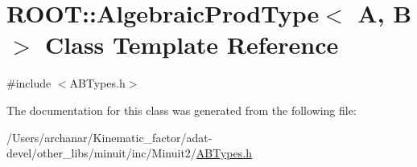 \hypertarget{classROOT_1_1Minuit2_1_1AlgebraicProdType}{}\section{R\+O\+OT\+:\+:Algebraic\+Prod\+Type$<$ A, B $>$ Class Template Reference}
\label{classROOT_1_1Minuit2_1_1AlgebraicProdType}


{\ttfamily \#include $<$A\+B\+Types.\+h$>$}



The documentation for this class was generated from the following file\+:\begin{DoxyCompactItemize}
\item 
/\+Users/archanar/\+Kinematic\+\_\+factor/adat-\/devel/other\+\_\+libs/minuit/inc/\+Minuit2/\mbox{\hyperlink{adat-devel_2other__libs_2minuit_2inc_2Minuit2_2ABTypes_8h}{A\+B\+Types.\+h}}\end{DoxyCompactItemize}

